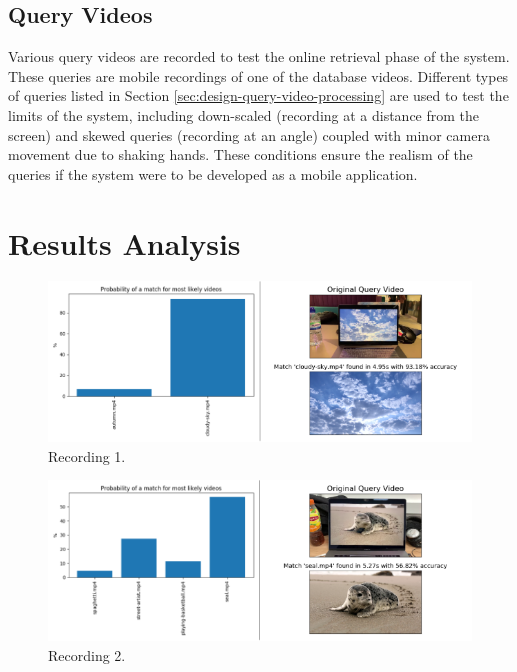 \subsection{Query Videos}

Various query videos are recorded to test the online retrieval phase of the system. These queries are mobile recordings of one of the database videos. Different types of queries listed in Section \ref{sec:design-query-video-processing} are used to test the limits of the system, including down-scaled (recording at a distance from the screen) and skewed queries (recording at an angle) coupled with minor camera movement due to shaking hands. These conditions ensure the realism of the queries if the system were to be developed as a mobile application.


\section{Results Analysis}

\begin{figure}[h] 
\centerline{\includegraphics[width=\textwidth]{figures/evaluation/recording1-results.png}}
\caption{\label{fig:design-recording1-results}Recording 1.}
\end{figure}

\begin{figure}[h] 
\centerline{\includegraphics[width=\textwidth]{figures/evaluation/recording2-results.png}}
\caption{\label{fig:design-recording2-results}Recording 2.}
\end{figure}

